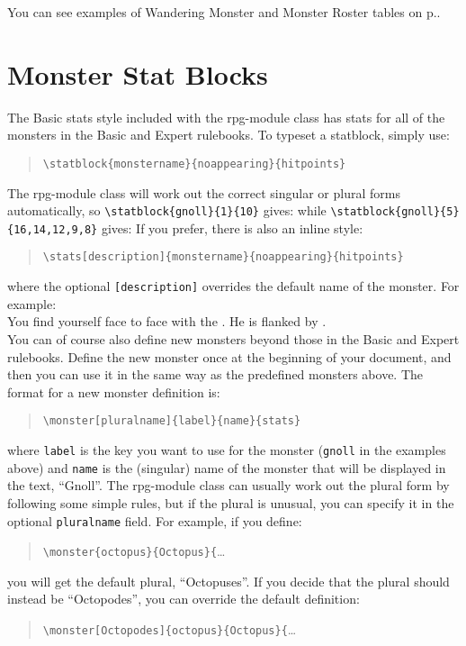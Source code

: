 \documentclass[a4paper,serif]{rpg-module}
\begin{document}
You can see examples of Wandering Monster and Monster Roster tables on p.\pageref{wanderingmonsters}.

\section{Monster Stat Blocks}
\label{stat_blocks}

The Basic stats style included with the rpg-module class has stats for all of the monsters in the Basic and Expert rulebooks.
To typeset a statblock, simply use:
\begin{quote}
\verb|\statblock{monstername}{noappearing}{hitpoints}|
\end{quote}
The rpg-module class will work out the correct singular or plural forms automatically, so
\verb|\statblock{gnoll}{1}{10}| gives:
while \verb|\statblock{gnoll}{5}{16,14,12,9,8}| gives:
If you prefer, there is also an inline style:
\begin{quote}
\hspace{-2em}\verb|\stats[description]{monstername}{noappearing}{hitpoints}|
\end{quote}
where the optional \verb|[description]| overrides the default name of the monster.
For example:\\[0.1em]

\noindent You find yourself face to face with the . He is flanked
by .\\[0.1em]

\noindent You can of course also define new monsters beyond those in the Basic and Expert rulebooks. Define the new
monster once at the beginning of your document, and then you can use it in the same way as the predefined
monsters above. The format for a new monster definition is:
\begin{quote}
\verb|\monster[pluralname]{label}{name}{stats}|
\end{quote}
where \verb|label| is the key you want to use for the monster (\verb|gnoll| in the examples above) and
\verb|name| is the (singular) name of the monster that will be displayed in the text, ``Gnoll''. The rpg-module
class can usually work out the plural form by following some simple rules, but if the plural is unusual,
you can specify it in the optional \verb|pluralname| field. For example, if you define:
\begin{quote}
\verb|\monster{octopus}{Octopus}{|\ldots
\end{quote}
you will get the default plural, ``Octopuses''. If you decide that the plural should instead be ``Octopodes'', you can override the default definition:
\begin{quote}
\verb|\monster[Octopodes]{octopus}{Octopus}{|\ldots
\end{quote}
\end{document}
